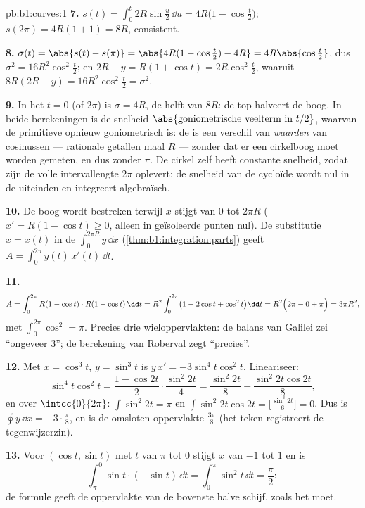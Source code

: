 \begin{solution}{pb:b1:curves:1}
\textbf{7.} $s(t) = \int_0^t 2R\sin\frac u2\,\dd u = 4R\bigl(1 -
\cos\frac t2\bigr)$; $s(2\pi) = 4R(1+1) = 8R$, consistent.

\textbf{8.} $\sigma(t) = \abs{s(t) - s(\pi)} = \abs{4R(1 -
\cos\frac t2) - 4R} = 4R\abs{\cos\frac t2}$, dus $\sigma^2 =
16R^2\cos^2\frac t2$; en $2R - y = R(1 + \cos t) = 2R\cos^2\frac
t2$, waaruit $8R(2R - y) = 16R^2\cos^2\frac t2 = \sigma^2$.

\textbf{9.} In het  $t = 0$ (of $2\pi$) is $\sigma = 4R$,
de helft van $8R$: de top halveert de boog. In beide berekeningen
is de snelheid $\abs{\text{goniometrische veelterm in } t/2}$,
waarvan de primitieve opnieuw goniometrisch is: de  is een
verschil van \emph{waarden} van cosinussen --- rationale getallen
maal $R$ --- zonder dat er een cirkelboog moet worden gemeten, en
dus zonder $\pi$. De cirkel zelf heeft constante snelheid, zodat
zijn  de volle intervallengte $2\pi$ oplevert; de
snelheid van de cycloïde wordt nul in de uiteinden en integreert
algebraïsch.

\textbf{10.} De boog wordt bestreken terwijl $x$ stijgt van $0$ tot
$2\pi R$ ($x' = R(1 - \cos t) \geq 0$, alleen in geïsoleerde punten
nul). De substitutie $x = x(t)$ in de 
$\int_0^{2\pi R} y\,\dd x$ (\cref{thm:b1:integration:parts}) geeft
$A = \int_0^{2\pi} y(t)\,x'(t)\,\dd t$.

\textbf{11.}
\[
A = \int_0^{2\pi} R(1 - \cos t)\cdot R(1 - \cos t)\,\dd t
= R^2\int_0^{2\pi}\bigl(1 - 2\cos t + \cos^2 t\bigr)\dd t
= R^2\Bigl(2\pi - 0 + \pi\Bigr) = 3\pi R^2 ,
\]
met $\int_0^{2\pi}\cos^2 = \pi$. Precies drie wieloppervlakten: de
balans van Galilei zei ``ongeveer $3$''; de berekening van Roberval
zegt ``precies''.

\textbf{12.} Met $x = \cos^3 t$, $y = \sin^3 t$ is $y\,x' =
-3\sin^4 t\cos^2 t$. Lineariseer:
\[
\sin^4 t\cos^2 t = \frac{1 - \cos 2t}{2}\cdot\frac{\sin^2
2t}{4} = \frac{\sin^2 2t}{8} - \frac{\sin^2 2t\cos 2t}{8} ,
\]
en over $\intcc{0}{2\pi}$: $\int\sin^2 2t = \pi$ en $\int \sin^2
2t\cos 2t = \bigl[\frac{\sin^3 2t}{6}\bigr] = 0$. Dus is $\oint
y\,\dd x = -3\cdot\frac\pi8$, en is de omsloten oppervlakte
$\frac{3\pi}8$ (het teken registreert de tegenwijzerzin).

\textbf{13.} Voor $(\cos t, \sin t)$ met $t$ van $\pi$ tot $0$
stijgt $x$ van $-1$ tot $1$ en is
\[
\int_\pi^0 \sin t\cdot(-\sin t)\,\dd t
= \int_0^\pi \sin^2 t\,\dd t = \frac\pi2 :
\]
de formule geeft de oppervlakte van de bovenste halve schijf, zoals
het moet.


\end{solution}
